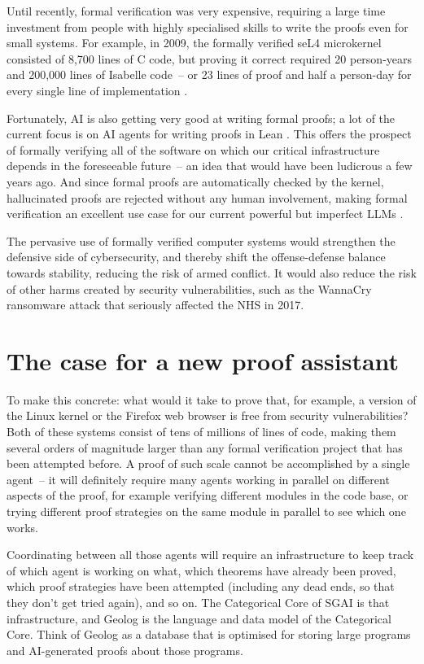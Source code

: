 \documentclass{article}
\begin{document}
Until recently, formal verification was very expensive, requiring a large time investment from people with highly specialised skills to write the proofs even for small systems.
For example, in 2009, the formally verified seL4 microkernel consisted of 8,700 lines of C code, but proving it correct required 20 person-years and 200,000 lines of Isabelle code~-- or 23 lines of proof and half a person-day for every single line of implementation \citep{Klein2009}.

Fortunately, AI is also getting very good at writing formal proofs; a lot of the current focus is on AI agents for writing proofs in Lean \citep{deMoura2026,Aristotle,LogicalIntelligence,Leanstral,OpenGauss,Chen2025,Ren2025}.
This offers the prospect of formally verifying all of the software on which our critical infrastructure depends in the foreseeable future~-- an idea that would have been ludicrous a few years ago.
And since formal proofs are automatically checked by the kernel, hallucinated proofs are rejected without any human involvement, making formal verification an excellent use case for our current powerful but imperfect LLMs \citep{Kleppmann2025}.

The pervasive use of formally verified computer systems would strengthen the defensive side of cybersecurity, and thereby shift the offense-defense balance towards stability, reducing the risk of armed conflict.
It would also reduce the risk of other harms created by security vulnerabilities, such as the WannaCry ransomware attack that seriously affected the NHS in 2017.

\section{The case for a new proof assistant}

To make this concrete: what would it take to prove that, for example, a version of the Linux kernel or the Firefox web browser is free from security vulnerabilities?
Both of these systems consist of tens of millions of lines of code, making them several orders of magnitude larger than any formal verification project that has been attempted before.
A proof of such scale cannot be accomplished by a single agent~-- it will definitely require many agents working in parallel on different aspects of the proof, for example verifying different modules in the code base, or trying different proof strategies on the same module in parallel to see which one works.

Coordinating between all those agents will require an infrastructure to keep track of which agent is working on what, which theorems have already been proved, which proof strategies have been attempted (including any dead ends, so that they don't get tried again), and so on.
The Categorical Core of SGAI is that infrastructure, and Geolog is the language and data model of the Categorical Core.
Think of Geolog as a database that is optimised for storing large programs and AI-generated proofs about those programs.
\end{document}

